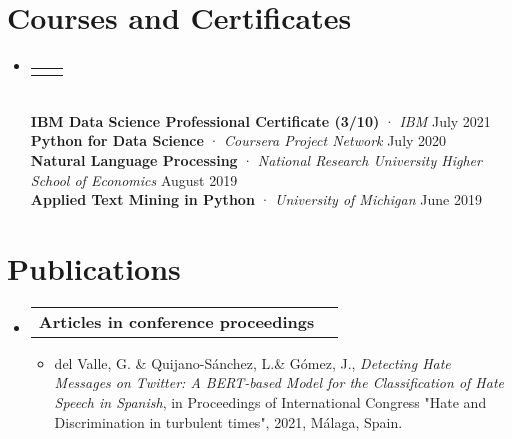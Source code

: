 \documentclass[letterpaper,11pt]{article}
\makeatletter
\newcommand{\resumeItem}[1]{
  \item\small{
    {#1 \vspace{-2pt}}
  }
}
\newcommand{\resumeProjectHeading}[2]{
    \item
    \begin{tabular*}{0.97\textwidth}{l@{\extracolsep{\fill}}r}
      \small#1 & #2 \\
    \end{tabular*}\vspace{-7pt}
}
\newcommand{\resumeSubHeadingListStart}{\begin{itemize}[leftmargin=0.15in, label={}]}
\newcommand{\resumeSubHeadingListEnd}{\end{itemize}}
\newcommand{\resumeItemListStart}{\begin{itemize}}
\newcommand{\resumeItemListEnd}{\end{itemize}\vspace{-5pt}}
\makeatother
\begin{document}
\section{Courses and Certificates}
    \resumeSubHeadingListStart
      \resumeProjectHeading
          {}{}\\
          \vspace{-0.4em}
          {\textbf{IBM Data Science Professional Certificate (3/10)} · \emph{IBM}}{ \hspace{15.3em} July 2021}\\
          \vspace{0.3em}
          {\textbf{Python for Data Science} · \emph{Coursera Project Network}}{ \hspace{18.5em} July 2020}\\
          \vspace{0.3em}
          {\textbf{Natural Language Processing} · \emph{National Research University Higher School of Economics }}{ \hspace{0.5em} August 2019} \\
          \vspace{0.3em}
          {\textbf{Applied Text Mining in Python} · \emph{University of Michigan}}{ \hspace{16em} June 2019}\\
  
          
          
    \resumeSubHeadingListEnd

\section{Publications}
    \resumeSubHeadingListStart
      \resumeProjectHeading
          {\textbf{Articles in conference proceedings}}{ }
          
          \resumeItemListStart
          \resumeItem{del Valle, G. \& Quijano-Sánchez, L.\& Gómez, J., \emph{Detecting Hate Messages on Twitter: A BERT-based Model for the Classification of Hate Speech in Spanish}, in Proceedings of International Congress "Hate and Discrimination in turbulent times", 2021, Málaga, Spain.}
          \resumeItemListEnd
    \resumeSubHeadingListEnd
\end{document}
